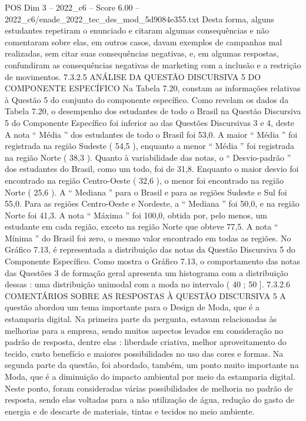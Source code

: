 \begin{textsample}{POS Dim 3 – 2022\_c6 – Score 6.00 – 2022\_c6/enade\_2022\_tec\_des\_mod\_5d9084e355.txt}
Desta forma, alguns estudantes repetiram o enunciado e citaram algumas consequências e não comentaram sobre elas, em outros casos, davam exemplos de campanhas mal realizadas, sem citar suas consequências negativas, e, em algumas respostas, confundiram as consequências negativas de marketing com a inclusão e a restrição de movimentos. 7.3.2.5 ANÁLISE DA QUESTÃO DISCURSIVA 5 DO COMPONENTE ESPECÍFICO Na Tabela 7.20, constam as informações relativas à Questão 5 do conjunto do componente específico.
Como revelam os dados da Tabela 7.20, o desempenho dos estudantes de todo o Brasil na Questão Discursiva 5 do Componente Específico foi inferior ao das Questões Discursivas 3 e 4, deste A nota “ Média ” dos estudantes de todo o Brasil foi 53,0.
A maior “ Média ” foi registrada na região Sudeste ( 54,5 ), enquanto a menor “ Média ” foi registrada na região Norte ( 38,3 ).
Quanto à variabilidade das notas, o “ Desvio-padrão ” dos estudantes do Brasil, como um todo, foi de 31,8.
Enquanto o maior desvio foi encontrado na região Centro-Oeste ( 32,6 ), o menor foi encontrado na região Norte ( 25,6 ).
A “ Mediana ” para o Brasil e para as regiões Sudeste e Sul foi 55,0.
Para as regiões Centro-Oeste e Nordeste, a “ Mediana ” foi 50,0, e na região Norte foi 41,3.
A nota “ Máxima ” foi 100,0, obtida por, pelo menos, um estudante em cada região, exceto na região Norte que obteve 77,5.
A nota “ Mínima ” do Brasil foi zero, o mesmo valor encontrado em todas as regiões.
No Gráfico 7.13, é representada a distribuição das notas da Questão Discursiva 5 do Componente Específico.
Como mostra o Gráfico 7.13, o comportamento das notas das Questões 3 de formação geral apresenta um histograma com a distribuição dessas : uma distribuição unimodal com a moda no intervalo ( 40 ; 50 ]. 7.3.2.6 COMENTÁRIOS SOBRE AS RESPOSTAS À QUESTÃO DISCURSIVA 5 A questão abordou um tema importante para o Design de Moda, que é a estamparia digital.
Na primeira parte da pergunta, estavam relacionadas às melhorias para a empresa, sendo muitos aspectos levados em consideração no padrão de resposta, dentre elas : liberdade criativa, melhor aproveitamento do tecido, custo benefício e maiores possibilidades no uso das cores e formas.
Na segunda parte da questão, foi abordado, também, um ponto muito importante na Moda, que é a diminuição do impacto ambiental por meio da estamparia digital.
Neste ponto, foram consideradas várias possibilidades de melhoria no padrão de resposta, sendo elas voltadas para a não utilização de água, redução do gasto de energia e de descarte de materiais, tintas e tecidos no meio ambiente.

\end{textsample}

